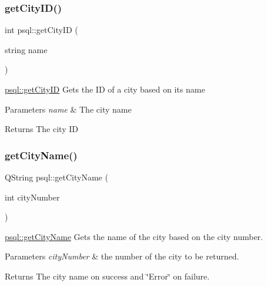 \subsubsection{\texorpdfstring{get\+City\+I\+D()}{getCityID()}\hspace{0.1cm}{\footnotesize\ttfamily [2/2]}}
{\footnotesize\ttfamily int psql\+::get\+City\+ID (\begin{DoxyParamCaption}\item[{string}]{name }\end{DoxyParamCaption})}



\mbox{\hyperlink{classpsql_af3462a12dc106e0ca8df4fa8fcf28436}{psql\+::get\+City\+ID}} Gets the ID of a city based on its name 


\begin{DoxyParams}{Parameters}
{\em name} & The city name \\
\hline
\end{DoxyParams}
\begin{DoxyReturn}{Returns}
The city ID 
\end{DoxyReturn}
\mbox{\label{classpsql_a7acc18034ef60c8a1e69b0e1a15d8ab2}} 
\subsubsection{\texorpdfstring{get\+City\+Name()}{getCityName()}}
{\footnotesize\ttfamily Q\+String psql\+::get\+City\+Name (\begin{DoxyParamCaption}\item[{int}]{city\+Number }\end{DoxyParamCaption})}



\mbox{\hyperlink{classpsql_a7acc18034ef60c8a1e69b0e1a15d8ab2}{psql\+::get\+City\+Name}} Gets the name of the city based on the city number. 


\begin{DoxyParams}{Parameters}
{\em city\+Number} & the number of the city to be returned. \\
\hline
\end{DoxyParams}
\begin{DoxyReturn}{Returns}
The city name on success and \char`\"{}\+Error\char`\"{} on failure. 
\end{DoxyReturn}
\mbox{\label{classpsql_a42ee0cf90055ba6a7a6f564cf04d8bb8}} 
